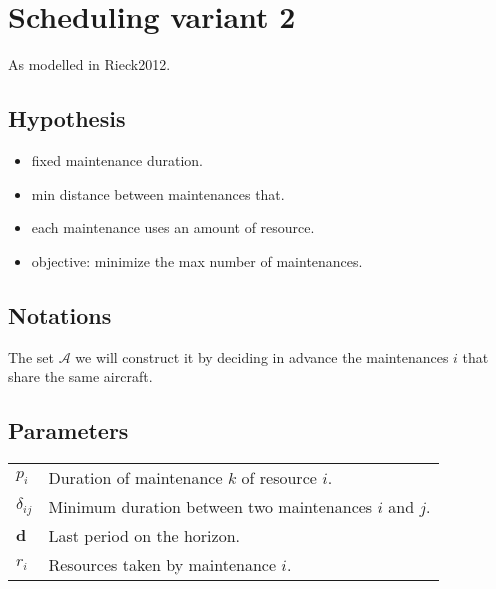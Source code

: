 \documentclass[a4paper,11pt]{article}
\begin{document}
\clearpage

\section{Scheduling variant 2}

    As modelled in Rieck2012.

    \subsection{Hypothesis}

    \begin{itemize}
     \item fixed maintenance duration.
     \item min distance between maintenances that.
     \item each maintenance uses an amount of resource.
     \item objective: minimize the max number of maintenances.
    \end{itemize}

      \subsection{Notations}


    \vskip 0.3cm

    The set $\mathcal{A}$ we will construct it by deciding in advance the maintenances $i$ that share the same aircraft.

    \subsection{Parameters}


    \begin{tabular}{ll}
        $p_{i}$ & Duration of maintenance $k$ of resource $i$.\\
        ${\delta}_{ij}$ & Minimum duration between two maintenances $i$ and $j$.\\
        $\mathbf{d}$ & Last period on the horizon.\\
        $r_{i}$ & Resources taken by maintenance $i$.\\
    \end{tabular}
\end{document}
